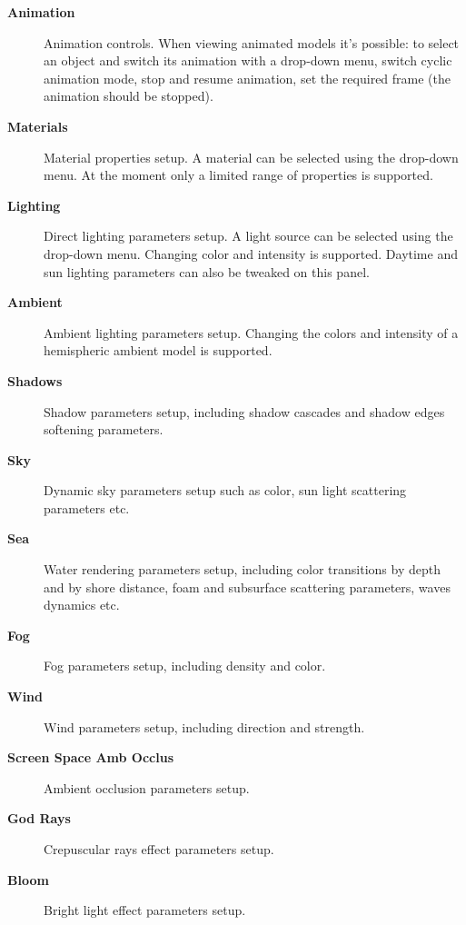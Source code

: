 \documentclass[a4paper,12pt,oneside]{sphinxmanual}
\begin{document}
\begin{description}
\item[{\textbf{Animation}}] \leavevmode
Animation controls. When viewing animated models it's possible: to select an object and switch its animation with a drop-down menu, switch cyclic animation mode, stop and resume animation, set the required frame (the animation should be stopped).

\item[{\textbf{Materials}}] \leavevmode
Material properties setup. A material can be selected using the drop-down menu. At the moment only a limited range of properties is supported.

\item[{\textbf{Lighting}}] \leavevmode
Direct lighting parameters setup. A light source can be selected using the drop-down menu. Changing color and intensity is supported. Daytime and sun lighting parameters can also be tweaked on this panel.

\item[{\textbf{Ambient}}] \leavevmode
Ambient lighting parameters setup. Changing the colors and intensity of a hemispheric ambient model is supported.

\item[{\textbf{Shadows}}] \leavevmode
Shadow parameters setup, including shadow cascades and shadow edges softening parameters.

\item[{\textbf{Sky}}] \leavevmode
Dynamic sky parameters setup such as color, sun light scattering parameters etc.

\item[{\textbf{Sea}}] \leavevmode
Water rendering parameters setup, including color transitions by depth and by shore distance, foam and subsurface scattering parameters, waves dynamics etc.

\item[{\textbf{Fog}}] \leavevmode
Fog parameters setup, including density and color.

\item[{\textbf{Wind}}] \leavevmode
Wind parameters setup, including direction and strength.

\item[{\textbf{Screen Space Amb Occlus}}] \leavevmode
Ambient occlusion parameters setup.

\item[{\textbf{God Rays}}] \leavevmode
Crepuscular rays effect parameters setup.

\item[{\textbf{Bloom}}] \leavevmode
Bright light effect parameters setup.


\end{description}
\end{document}
